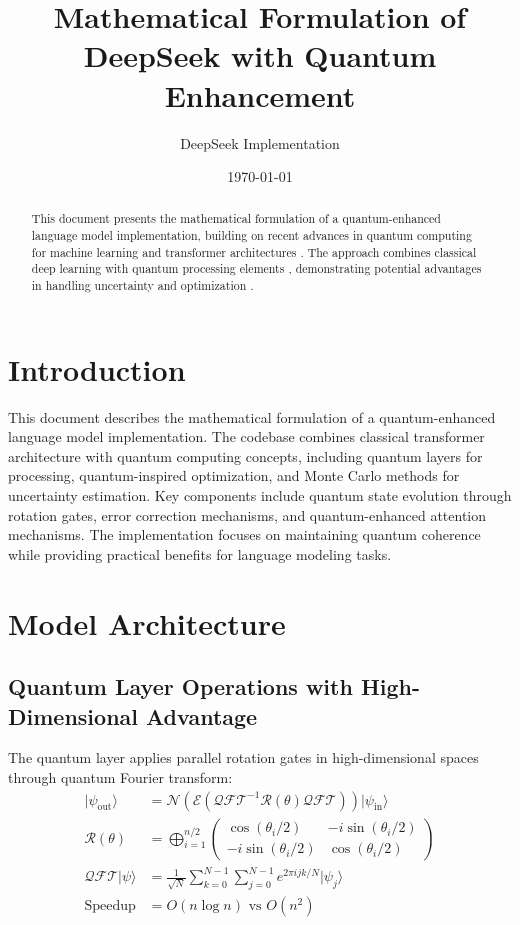 \documentclass{article}
\title{Mathematical Formulation of DeepSeek with Quantum Enhancement}
\author{DeepSeek Implementation}
\date{\today}
\begin{document}
\maketitle

\begin{abstract}
This document presents the mathematical formulation of a quantum-enhanced language model implementation, building on recent advances in quantum computing for machine learning \citep{bharti2022noisy} and transformer architectures \citep{vaswani2017attention}. The approach combines classical deep learning with quantum processing elements \citep{schuld2019quantum}, demonstrating potential advantages in handling uncertainty \citep{gal2016dropout} and optimization \citep{farhi2018classification}.
\end{abstract}

\section*{Introduction}
This document describes the mathematical formulation of a quantum-enhanced language model implementation. The codebase combines classical transformer architecture with quantum computing concepts, including quantum layers for processing, quantum-inspired optimization, and Monte Carlo methods for uncertainty estimation. Key components include quantum state evolution through rotation gates, error correction mechanisms, and quantum-enhanced attention mechanisms. The implementation focuses on maintaining quantum coherence while providing practical benefits for language modeling tasks.

\section{Model Architecture}

\subsection{Quantum Layer Operations with High-Dimensional Advantage}
The quantum layer applies parallel rotation gates in high-dimensional spaces through quantum Fourier transform:
\begin{align*}
|\psi_{\text{out}}\rangle &= \mathcal{N}(\mathcal{E}(\mathcal{QFT}^{-1}\mathcal{R}(\theta)\mathcal{QFT}))|\psi_{\text{in}}\rangle \\
\mathcal{R}(\theta) &= \bigoplus_{i=1}^{n/2} \begin{pmatrix} \cos(\theta_i/2) & -i\sin(\theta_i/2) \\ -i\sin(\theta_i/2) & \cos(\theta_i/2) \end{pmatrix} \\
\mathcal{QFT}|\psi\rangle &= \frac{1}{\sqrt{N}}\sum_{k=0}^{N-1}\sum_{j=0}^{N-1}e^{2\pi i jk/N}|\psi_j\rangle \\
\text{Speedup} &= O(n\log n) \text{ vs } O(n^2)
\end{align*}
\end{document}
